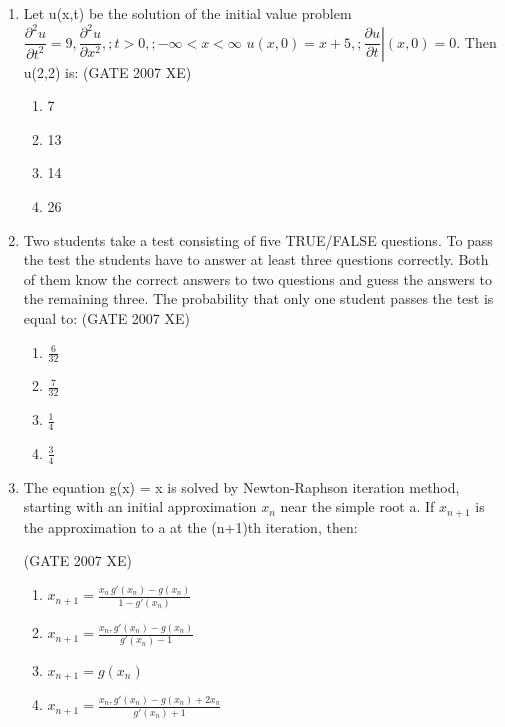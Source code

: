 \documentclass[journal,cmex10]{IEEEtran}
\theoremstyle{remark}
\numberwithin{equation}{enumi}
\numberwithin{figure}{enumi}
\begin{document}
\begin{enumerate}
    \item Let u(x,t) be the solution of the initial value problem $ \dfrac{\partial^{2}u}{\partial t^{2}} = 9,\dfrac{\partial^{2}u}{\partial x^{2}},; t>0,; -\infty<x<\infty $
$ u(x,0)=x+5,; \left.\dfrac{\partial u}{\partial t}\right|(x,0)=0 $. Then u(2,2) is:
    \hfill{(GATE 2007 XE)}
    \begin{multicols}{4}
        \begin{enumerate}
        \item 7
        \item 13
        \item 14
        \item 26
    \end{enumerate}
\end{multicols}

    \item Two students take a test consisting of five TRUE/FALSE questions. To pass the test the students have to answer at least three questions correctly. Both of them know the correct answers to two questions and guess the answers to the remaining three. The probability that only one student passes the test is equal to:
    \hfill{(GATE 2007 XE)}
    \begin{multicols}{4}
    \begin{enumerate}
    
        \item $\frac{6}{32}$
        \item $\frac{7}{32}$
        \item $\frac{1}{4}$
        \item $\frac{3}{4}$
    \end{enumerate}
    \end{multicols}

    \item The equation g(x) = x is solved by Newton-Raphson iteration method, starting with an initial approximation $x_n$ near the simple root a. If $x_{n+1}$ is the approximation to a at the (n+1)th iteration, then:

    \hfill{(GATE 2007 XE)}
    \begin{multicols}{4}
    \begin{enumerate}
        \item $ x_{n+1}=\frac{x_n\,g'(x_n)-g(x_n)}{1-g'(x_n)} $
        \item $ x_{n+1}=\frac{x_n,g'(x_n)-g(x_n)}{g'(x_n)-1} $
        \item $ x_{n+1}=g(x_n) $
        \item $ x_{n+1}=\frac{x_n,g'(x_n)-g(x_n)+2x_n}{g'(x_n)+1} $
    \end{enumerate}
\end{multicols}


\end{enumerate}
\end{document}
